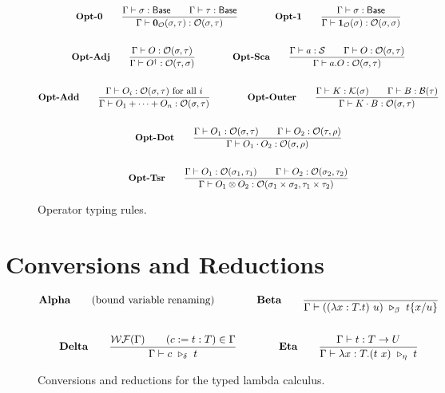 \documentclass{article}
\begin{document}
\begin{figure}[h]
    \begin{gather*}
        \textbf{Opt-0} \qquad
        \frac{\Gamma \vdash \sigma : \mathsf{Base} \qquad \Gamma \vdash \tau : \mathsf{Base}}{\Gamma \vdash \mathbf{0}_\mathcal{O}(\sigma, \tau) : \mathcal{O}(\sigma, \tau)} 
        \qquad \qquad
        \textbf{Opt-1} \qquad
        \frac{\Gamma \vdash \sigma : \mathsf{Base}}{\Gamma \vdash \mathbf{1}_\mathcal{O}(\sigma) : \mathcal{O}(\sigma, \sigma)} \\
        \\
        \textbf{Opt-Adj} \qquad
        \frac{\Gamma \vdash O : \mathcal{O}(\sigma, \tau)}{\Gamma \vdash O^\dagger : \mathcal{O}(\tau, \sigma)} 
        \qquad \qquad
        \textbf{Opt-Sca} \qquad
        \frac{\Gamma \vdash a : \mathcal{S} \qquad \Gamma \vdash O : \mathcal{O}(\sigma, \tau)}{\Gamma \vdash a.O : \mathcal{O}(\sigma, \tau)} \\
        \\
        \textbf{Opt-Add} \qquad
        \frac{\Gamma \vdash O_i : \mathcal{O}(\sigma, \tau) \text{ for all $i$}}{\Gamma \vdash O_1 + \cdots + O_n : \mathcal{O}(\sigma, \tau)}
        \qquad \qquad
        \textbf{Opt-Outer} \qquad
        \frac{\Gamma\vdash K : \mathcal{K}(\sigma) \qquad \Gamma\vdash B : \mathcal{B}(\tau)}{\Gamma\vdash K \cdot B : \mathcal{O}(\sigma, \tau)} \\
        \\
        \textbf{Opt-Dot} \qquad
        \frac{\Gamma \vdash O_1 : \mathcal{O}(\sigma, \tau) \qquad \Gamma \vdash O_2 : \mathcal{O}(\tau, \rho)}{\Gamma \vdash O_1 \cdot O_2 : \mathcal{O}(\sigma, \rho)} \\
        \\
        \textbf{Opt-Tsr} \qquad
        \frac{\Gamma \vdash O_1 : \mathcal{O}(\sigma_1, \tau_1) \qquad \Gamma \vdash O_2 : \mathcal{O}(\sigma_2, \tau_2)} {\Gamma \vdash O_1 \otimes O_2 : \mathcal{O}(\sigma_1 \times \sigma_2, \tau_1 \times \tau_2)}
    \end{gather*}
    \caption{Operator typing rules.}
\end{figure}

\clearpage
\section{Conversions and Reductions}
\begin{figure}[h]
    \begin{gather*}
        \textbf{Alpha} \qquad \text{(bound variable renaming)}
        \qquad \qquad
        \textbf{Beta} \qquad
        \frac{}{\Gamma \vdash ((\lambda x:T.t)\ u)\ \reduce_\beta\ t\{x/u\}} \\
        \\
        \textbf{Delta} \qquad
        \frac{\WF(\Gamma) \qquad (c:=t:T) \in \Gamma}{\Gamma \vdash c\ \reduce_\delta\ t}
        \qquad \qquad
        \textbf{Eta} \qquad
        \frac{\Gamma\vdash t : T \to U}{\Gamma \vdash \lambda x : T . (t\ x)\ \reduce_\eta\ t}
    \end{gather*}
    \caption{Conversions and reductions for the typed lambda calculus.}
\end{figure}
\end{document}
